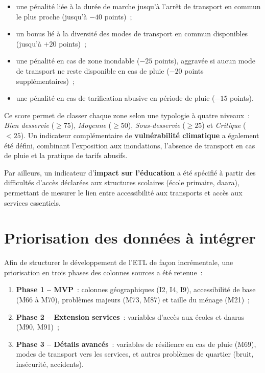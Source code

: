 \begin{itemize}
\item une pénalité liée à la durée de marche jusqu'à l'arrêt de transport en commun le plus proche (jusqu'à $-40$ points)~;
\item un bonus lié à la diversité des modes de transport en commun disponibles (jusqu'à $+20$ points)~;
\item une pénalité en cas de zone inondable ($-25$ points), aggravée si aucun mode de transport ne reste disponible en cas de pluie ($-20$ points supplémentaires)~;
\item une pénalité en cas de tarification abusive en période de pluie ($-15$ points).
\end{itemize}

Ce score permet de classer chaque zone selon une typologie à quatre niveaux~: \textit{Bien desservie} ($\geq 75$), \textit{Moyenne} ($\geq 50$), \textit{Sous-desservie} ($\geq 25$) et \textit{Critique} ($< 25$). Un indicateur complémentaire de \textbf{vulnérabilité climatique} a également été défini, combinant l'exposition aux inondations, l'absence de transport en cas de pluie et la pratique de tarifs abusifs.

Par ailleurs, un indicateur d'\textbf{impact sur l'éducation} a été spécifié à partir des difficultés d'accès déclarées aux structures scolaires (école primaire, daara), permettant de mesurer le lien entre accessibilité aux transports et accès aux services essentiels.

\section{Priorisation des données à intégrer}
Afin de structurer le développement de l'ETL de façon incrémentale, une priorisation en trois phases des colonnes sources a été retenue~:

\begin{enumerate}
\item \textbf{Phase 1 -- MVP}~: colonnes géographiques (I2, I4, I9), accessibilité de base (M66 à M70), problèmes majeurs (M73, M87) et taille du ménage (M21)~;
\item \textbf{Phase 2 -- Extension services}~: variables d'accès aux écoles et daaras (M90, M91)~;
\item \textbf{Phase 3 -- Détails avancés}~: variables de résilience en cas de pluie (M69), modes de transport vers les services, et autres problèmes de quartier (bruit, insécurité, accidents).
\end{enumerate}

